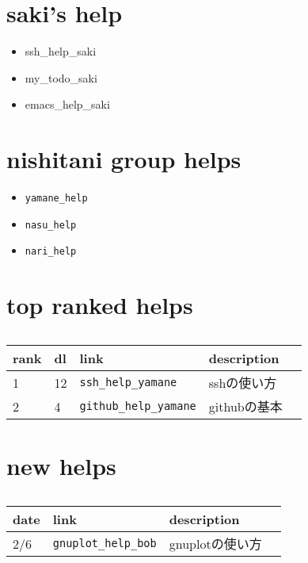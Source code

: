 \section{saki's help}
\begin{itemize}
\item ssh\_help\_saki
\item my\_todo\_saki
\item emacs\_help\_saki
\end{itemize}
\section{nishitani group helps}
\begin{itemize}
\item \verb|yamane_help|
\item \verb|nasu_help|
\item \verb|nari_help|
\end{itemize}
\section{top ranked helps}
\begin{table}[htbp]\begin{center}
\caption{}
\begin{tabular}{lllll}
\hline
rank  &dl  &link   &description  \\ \hline
1  &12  &\verb|ssh_help_yamane|  &sshの使い方  \\
2  &4  &\verb|github_help_yamane|  &githubの基本  \\
\hline
\end{tabular}
\label{default}
\end{center}\end{table}

\section{new helps}
\begin{table}[htbp]\begin{center}
\caption{}
\begin{tabular}{llll}
\hline
date   &link   &description  \\ \hline
2/6   &\verb|gnuplot_help_bob|   &gnuplotの使い方  \\
\hline
\end{tabular}
\label{default}
\end{center}\end{table}

